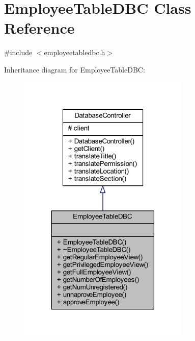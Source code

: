 \hypertarget{class_employee_table_d_b_c}{}\section{Employee\+Table\+D\+B\+C Class Reference}
\label{class_employee_table_d_b_c}


{\ttfamily \#include $<$employeetabledbc.\+h$>$}



Inheritance diagram for Employee\+Table\+D\+B\+C\+:
\nopagebreak
\begin{figure}[H]
\begin{center}
\leavevmode
\includegraphics[width=231pt]{class_employee_table_d_b_c__inherit__graph}
\end{center}
\end{figure}


